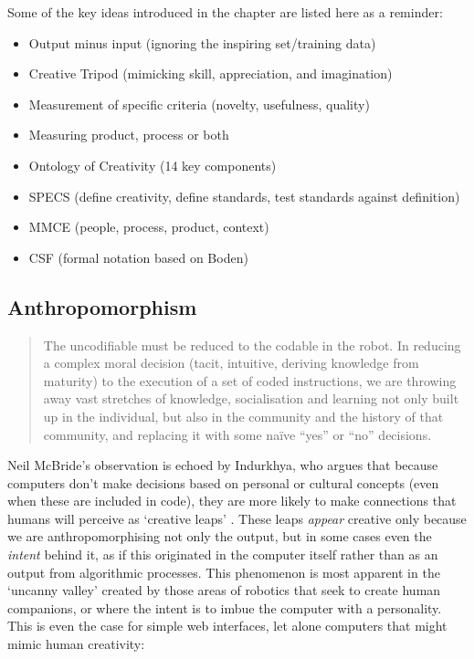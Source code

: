\spirals

Some of the key ideas introduced in the  chapter are listed here as a reminder:

\begin{itemize}
  \item Output minus input (ignoring the inspiring set/training data)
  \item Creative Tripod (mimicking skill, appreciation, and imagination)
  \item Measurement of specific criteria (novelty, usefulness, quality)
  \item Measuring product, process or both
  \item Ontology of Creativity (14 key components)
  \item \ac{SPECS} (define creativity, define standards, test standards against definition)
  \item \ac{MMCE} (people, process, product, context)
  \item \ac{CSF} (formal notation based on Boden)
\end{itemize}


\subsection{Anthropomorphism}
\label{ss:anthropomorphism}

\begin{quotation}
  The uncodifiable must be reduced to the codable in the robot. In reducing a complex moral decision (tacit, intuitive, deriving knowledge from maturity) to the execution of a set of coded instructions, we are throwing away vast stretches of knowledge, socialisation and learning not only built up in the individual, but also in the community and the history of that community, and replacing it with some na{\"i}ve ``yes'' or ``no'' decisions. 
\end{quotation}

Neil McBride's observation is echoed by Indurkhya, who argues that because computers don't make decisions based on personal or cultural concepts (even when these are included in code), they are more likely to make connections that humans will perceive as `creative leaps' \autocite{Indurkhya1997}. These leaps \emph{appear} creative only because we are anthropomorphising not only the output, but in some cases even the \emph{intent} behind it, as if this originated in the computer itself rather than as an output from algorithmic processes. This phenomenon is most apparent in the `uncanny valley' created by those areas of robotics that seek to create human companions, or where the intent is to imbue the computer with a personality. This is even the case for simple web interfaces, let alone computers that might mimic human creativity:

